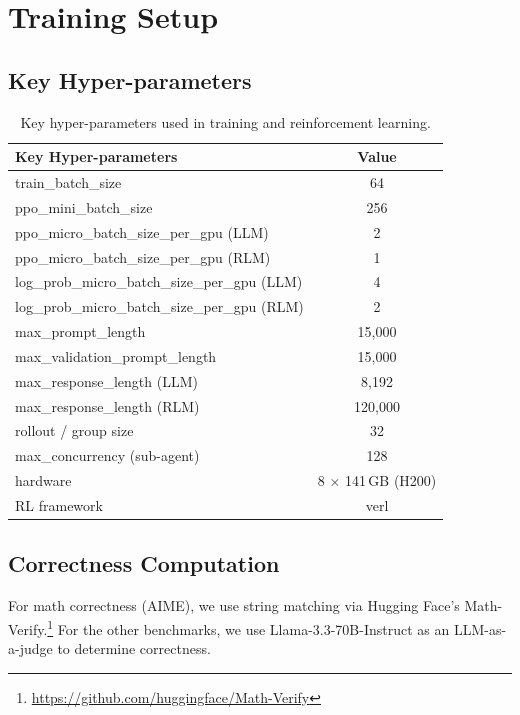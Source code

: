 \section{Training Setup}
\label{ap:training_setup}


\subsection{Key Hyper-parameters}


\begin{table}[h]
\centering
\small
\begin{tabular}{l c}
\toprule
\textbf{Key Hyper-parameters} & \textbf{Value} \\
\midrule
train\_batch\_size & 64 \\
ppo\_mini\_batch\_size & 256 \\
ppo\_micro\_batch\_size\_per\_gpu (LLM) & 2 \\
ppo\_micro\_batch\_size\_per\_gpu (RLM) & 1 \\
log\_prob\_micro\_batch\_size\_per\_gpu (LLM) & 4 \\
log\_prob\_micro\_batch\_size\_per\_gpu (RLM) & 2 \\
max\_prompt\_length & 15{,}000 \\
max\_validation\_prompt\_length & 15{,}000 \\
max\_response\_length (LLM) & 8{,}192 \\
max\_response\_length (RLM) & 120{,}000 \\
rollout / group size & 32 \\
max\_concurrency (sub-agent) & 128 \\
hardware & 8 $\times$ 141\,GB (H200) \\
RL framework & verl \\
\bottomrule
\end{tabular}
\caption{Key hyper-parameters used in training and reinforcement learning.}
\label{tab:hyperparameters}
\end{table}

\subsection{Correctness Computation}

For math correctness (AIME), we use string matching via Hugging Face’s Math-Verify.\footnote{\url{https://github.com/huggingface/Math-Verify}} For the other benchmarks, we use Llama-3.3-70B-Instruct \cite{grattafiori2024llama3herdmodels} as an LLM-as-a-judge to determine correctness.



